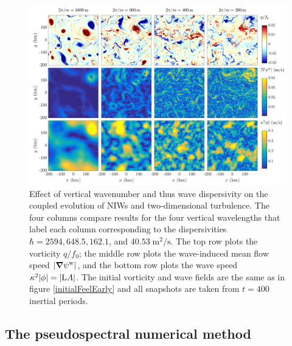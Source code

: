 \documentclass[12pt, oneside]{book}
\begin{document}
\begin{subappendices}
\begin{figure}
\centering
\includegraphics[width = 1\textwidth]{dispersivity_t400}
\caption[Effect of vertical wavenumber on coupled NIW and 2D turbulence evolution]{Effect of vertical wavenumber and thus wave dispersivity on the coupled evolution of NIWs and two-dimensional turbulence.  The four columns compare results for the four vertical wavelengths that label each column corresponding to the dispersivities $\hbar = 2594, 648.5, 162.1$, and $40.53 \; \mathrm{m^2/s}$.  The top row plots the vorticity $q/f_0$; the middle row plots the wave-induced mean flow speed $| \boldsymbol \nabla \psi^{\mathrm{w}} |$, and the bottom row plots the wave speed $\kappa^2 | \phi | = | \mathrm{L} A |$.  The initial vorticity and wave fields are the same as in figure \ref{initialFeelEarly} and all snapshots are taken from $t=400$ inertial periods.}
\label{comparingTinySpectrums}
\end{figure}

\subsection{The pseudospectral numerical method}
\label{pseudospectralNumerics2D}


\end{subappendices}
\end{document}
